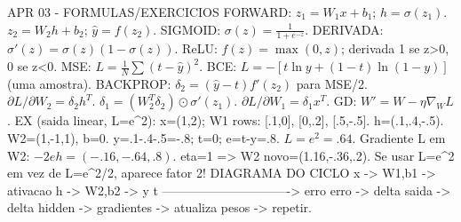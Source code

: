 APR 03 - FORMULAS/EXERCICIOS
FORWARD:
$z_1=W_1x+b_1$; $h=\sigma(z_1)$.
$z_2=W_2h+b_2$; $\hat y=f(z_2)$.
SIGMOID: $\sigma(z)=\frac{1}{1+e^{-z}}$.
DERIVADA: $\sigma'(z)=\sigma(z)(1-\sigma(z))$.
ReLU: $f(z)=\max(0,z)$; derivada 1 se z>0, 0 se z<0.
MSE: $L=\frac{1}{N}\sum(t-\hat y)^2$.
BCE: $L=-[t\ln y+(1-t)\ln(1-y)]$ (uma amostra).
BACKPROP: $\delta_2=(\hat y-t)f'(z_2)$ para MSE/2.
$\partial L/\partial W_2=\delta_2h^T$.
$\delta_1=(W_2^T\delta_2)\odot\sigma'(z_1)$.
$\partial L/\partial W_1=\delta_1x^T$.
GD: $W'=W-\eta\nabla_W L$.
EX (saida linear, L=e^2):
x=(1,2); W1 rows: [.1,0], [0,.2], [.5,-.5].
h=(.1,.4,-.5). W2=(1,-1,1), b=0.
y=.1-.4-.5=-.8; t=0; e=t-y=.8.
$L=e^2=.64$.
Gradiente L em W2: $-2eh=(-.16,-.64,.8)$.
eta=1 => W2 novo=(1.16,-.36,.2).
Se usar L=e^2 em vez de L=e^2/2, aparece fator 2!
DIAGRAMA DO CICLO
x -> W1,b1 -> ativacao h -> W2,b2 -> y
t -------------------------------> erro
erro -> delta saida -> delta hidden
         -> gradientes -> atualiza pesos -> repetir.